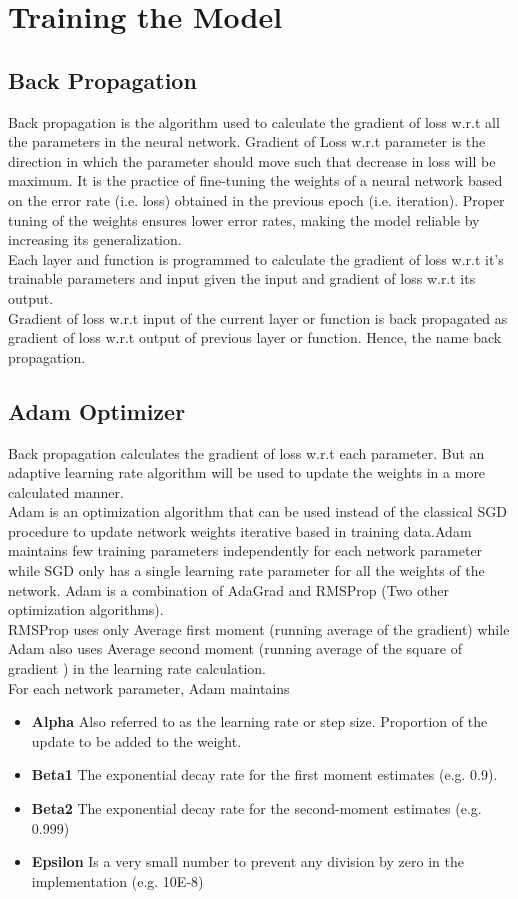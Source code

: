\documentclass[11pt,english]{article}
\begin{document}
\section{Training the Model}

\subsection{Back Propagation}
Back propagation is the algorithm used to calculate the gradient of loss w.r.t all the parameters in the neural network. Gradient of Loss w.r.t parameter is the direction in which the parameter should move such that decrease in loss will be maximum. It is the practice of fine-tuning the weights of a neural network based on the error rate (i.e. loss) obtained in the previous epoch (i.e. iteration). Proper tuning of the weights ensures lower error rates, making the model reliable by increasing its generalization.\\
Each layer and function is programmed to calculate the gradient of loss w.r.t it's trainable parameters and input given the input and gradient of loss w.r.t its output.\\
Gradient of loss w.r.t input of the current layer or function is back propagated as gradient of loss w.r.t output of previous layer or function. Hence, the name back propagation.

\subsection{Adam Optimizer}
Back propagation calculates the gradient of loss w.r.t each parameter. But an adaptive learning rate algorithm will be used to update the weights in a more calculated manner.\\
Adam is an optimization algorithm that can be used instead of the classical SGD procedure to update network weights iterative based in training data.Adam maintains few training parameters independently for each network parameter while SGD only has a single learning rate parameter for all the weights of the network. Adam is a combination of AdaGrad and RMSProp (Two other optimization algorithms).\\
RMSProp uses only Average first moment (running average of the gradient) while Adam also uses Average second moment (running average of the square of gradient ) in the learning rate calculation.\\
For each network parameter, Adam maintains 
\begin{itemize}
    \item \textbf{Alpha}
    Also referred to as the learning rate or step size. 
    Proportion of the update to be added to the weight.
    \item \textbf{Beta1}
    The exponential decay rate for the first moment estimates (e.g. 0.9).
    \item \textbf{Beta2}
    The exponential decay rate for the second-moment estimates (e.g. 0.999)
    \item \textbf{Epsilon}
    Is a very small number to prevent any division by zero in the implementation (e.g. 10E-8)
\end{itemize}
\end{document}
